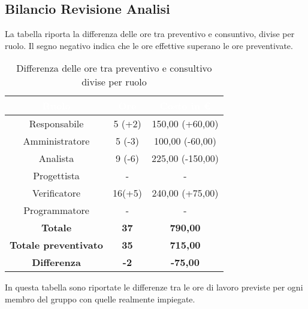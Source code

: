 \begin{flushleft}
    \newpage
    
    \section{Bilancio Revisione Analisi}
     La tabella riporta la differenza delle ore tra preventivo e consuntivo, divise per ruolo. Il segno negativo indica che le ore effettive superano le ore preventivate.  
  
\begin{table}[ht]
	\begin{center}
		\begin{tabular}{ccc}
			\rowcolor{coolblack}
			\hline
			\textcolor{white}{Ruolo} & \textcolor{white}{Ore} & \textcolor{white}{Costo in \euro}\\
			\hline
			Responsabile   & 5 (+2)  &  150,00 (+60,00) 	\\ 
			Amministratore & 5 (-3)  &  100,00 (-60,00) 	\\ 
			Analista       & 9 (-6)  &  225,00 (-150,00)   	\\ 
			Progettista    & -  	 &  - 					\\ 
			Verificatore   & 16(+5)  &  240,00 (+75,00) 	\\ 
			Programmatore  & -       &  -    		 		\\ \hline
			\textbf{Totale}& \textbf{37} & \textbf{790,00}	\\ \hline 
			\textbf{Totale preventivato}& \textbf{35} & \textbf{715,00}\\ \hline 
			\textbf{Differenza}& \textbf{-2} & \textbf{-75,00 }	\\ \hline  
		\end{tabular}
	
		\caption{Differenza delle ore tra preventivo e consultivo divise per ruolo} 
	\end{center}
\end{table}


In questa tabella  sono riportate le differenze tra le ore di lavoro previste per ogni membro del gruppo con quelle realmente impiegate.\\
  
      \begin{table}[ht]
  	\begin{center}
  		\begin{tabularx}{\textwidth}{|c|cccccc|c|}
  			

\end{tabularx}
\end{center}
\end{table}
\end{flushleft}
